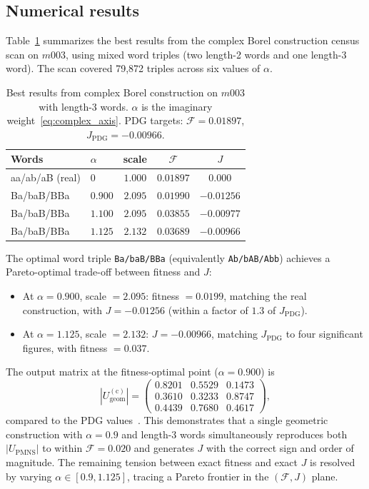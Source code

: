 \documentclass[epjc3]{svjour3}
\begin{document}
\subsection{Numerical results}

Table~\ref{tab:complex_results} summarizes the best results
from the complex Borel construction census scan on $m003$,
using mixed word triples (two length-2 words and one length-3 word).
The scan covered 79,872 triples across six values of $\alpha$.

\begin{table}[h]
\centering
\caption{Best results from complex Borel construction on $m003$
with length-3 words. $\alpha$ is the imaginary weight~\eqref{eq:complex_axis}.
PDG targets: $\mathcal{F} = 0.01897$, $J_{\mathrm{PDG}} = -0.00966$.}
\label{tab:complex_results}
\begin{tabular}{llccc}
\toprule
Words & $\alpha$ & scale & $\mathcal{F}$ & $J$ \\
\midrule
aa/ab/aB (real)   & $0$     & $1.000$ & $0.01897$ & $0.000$ \\
Ba/baB/BBa        & $0.900$ & $2.095$ & $0.01990$ & $-0.01256$ \\
Ba/baB/BBa        & $1.100$ & $2.095$ & $0.03855$ & $-0.00977$ \\
Ba/baB/BBa        & $1.125$ & $2.132$ & $0.03689$ & $-0.00966$ \\
\bottomrule
\end{tabular}
\end{table}

The optimal word triple \texttt{Ba/baB/BBa} (equivalently
\texttt{Ab/bAB/Abb}) achieves a Pareto-optimal trade-off
between fitness and $J$:
\begin{itemize}
\item At $\alpha = 0.900$, scale $= 2.095$: fitness $= 0.0199$,
matching the real construction, with $J = -0.01256$
(within a factor of $1.3$ of $J_{\mathrm{PDG}}$).
\item At $\alpha = 1.125$, scale $= 2.132$: $J = -0.00966$,
matching $J_{\mathrm{PDG}}$ to four significant figures,
with fitness $= 0.037$.
\end{itemize}
The output matrix at the fitness-optimal point ($\alpha = 0.900$) is
\begin{equation}
|U_{\mathrm{geom}}^{(\mathrm{c})}| = \begin{pmatrix}
0.8201 & 0.5529 & 0.1473 \\
0.3610 & 0.3233 & 0.8747 \\
0.4439 & 0.7680 & 0.4617
\end{pmatrix},
\end{equation}
compared to the PDG values~\cite{Gentry:PMNS}.
This demonstrates that a single geometric construction with
$\alpha = 0.9$ and length-3 words simultaneously reproduces
both $|U_{\mathrm{PMNS}}|$ to within $\mathcal{F} = 0.020$ and
generates $J$ with the correct sign and order of magnitude.
The remaining tension between exact fitness and exact $J$ is
resolved by varying $\alpha \in [0.9, 1.125]$, tracing a
Pareto frontier in the $(\mathcal{F}, J)$ plane.
\end{document}

